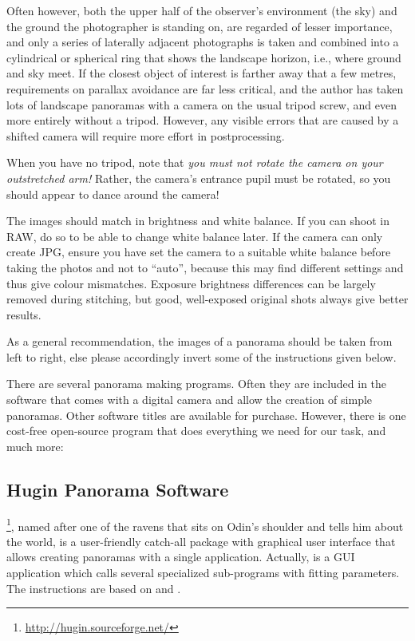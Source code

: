 Often however, both the upper half of the observer's environment (the
sky) and the ground the photographer is standing on, are regarded of
lesser importance, and only a series of laterally adjacent photographs
is taken and combined into a cylindrical or spherical ring that shows
the landscape horizon, i.e.,  where ground and sky meet. If the
closest object of interest is farther away that a few metres,
requirements on parallax avoidance are far less critical, and the author
has taken lots of landscape panoramas with a camera on the usual
tripod screw, and even more entirely without a tripod. However, any visible errors
that are caused by a shifted camera will require more effort in
postprocessing.

When you have no tripod, note that \emph{you must not rotate the
  camera on your outstretched arm!} Rather, the camera's entrance
pupil must be rotated, so you should appear to dance around the
camera!

The images should match in brightness and white balance. If you can
shoot in RAW, do so to be able to change white balance later. If the
camera can only create JPG, ensure you have set the camera to a suitable white balance
before taking the photos and not to ``auto'', because this may find different settings and
thus give colour mismatches. Exposure brightness differences can be
largely removed during stitching, but good, well-exposed original
shots always give better results.

As a general recommendation, the images of a panorama should be taken
from left to right, else please accordingly invert some of the
instructions given below.

There are several panorama making programs. Often they are included in
the software that comes with a digital camera and allow the creation
of simple panoramas. Other software titles are available for
purchase. However, there is one cost-free open-source program
that does everything we need for our task, and much more:


\subsection{Hugin Panorama Software}
\label{sec:landscapes:Hugin}

\footnote{\url{http://hugin.sourceforge.net/}}, named
after one of the ravens that sits on Odin's shoulder and tells him
about the world, is a user-friendly catch-all package with graphical
user interface that allows creating panoramas with a single
application. Actually,  is a GUI application which
calls several specialized sub-programs with fitting parameters.  The
instructions are based on  and
.

